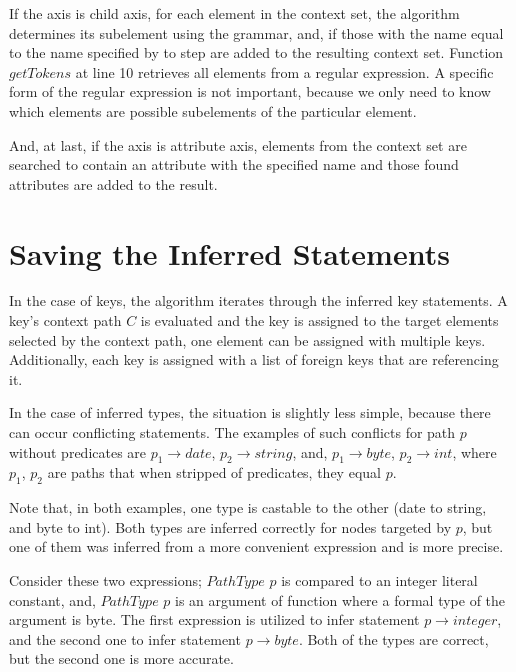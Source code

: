 If the axis is child axis, for each element in the context set, the algorithm determines its subelement using the grammar, and, if those with the name equal to the name specified by to step are added to the resulting context set. Function $getTokens$ at line 10 retrieves all elements from a regular expression. A specific form of the regular expression is not important, because we only need to know which elements are possible subelements of the particular element.

And, at last, if the axis is attribute axis, elements from the context set are searched to contain an attribute with the specified name and those found attributes are added to the result.

\section{Saving the Inferred Statements}
In the case of keys, the algorithm iterates through the inferred key statements. A key's context path $C$ is evaluated and the key is assigned to the target elements selected by the context path, one element can be assigned with multiple keys. Additionally, each key is assigned with a list of foreign keys that are referencing it.

In the case of inferred types, the situation is slightly less simple, because there can occur conflicting statements. The examples of such conflicts for path $p$ without predicates are $p_1 \rightarrow date$, $p_2 \rightarrow string$, and, $p_1 \rightarrow byte$, $p_2 \rightarrow int$, where $p_1$, $p_2$ are paths that when stripped of predicates, they equal $p$.

Note that, in both examples, one type is castable to the other (date to string, and byte to int). Both types are inferred correctly for nodes targeted by $p$, but one of them was inferred from a more convenient expression and is more precise.

Consider these two expressions; $PathType$ $p$ is compared to an integer literal constant, and, $PathType$ $p$ is an argument of function where a formal type of the argument is byte. The first expression is utilized to infer statement $p \rightarrow integer$, and the second one to infer statement $p \rightarrow byte$. Both of the types are correct, but the second one is more accurate.

